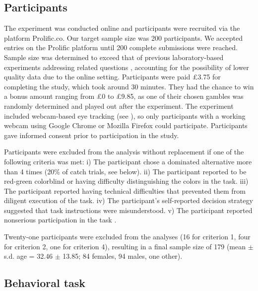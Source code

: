 \documentclass[11pt, a4paper, twocolumn, abstract]{scrartcl}
\begin{document}
\subsection*{Participants}
\label{methods:participants}
The experiment was conducted online and participants were recruited via the platform Prolific.co. Our target sample size was 200 participants. We accepted entries on the Prolific platform until 200 complete submissions were reached. Sample size was determined to exceed that of previous laboratory-based experiments addressing related questions \parencite[e.g.,][]{armel2008BiasingSimpleChoices,liu2020ExploitingDynamicsEye,parnamets2015BiasingMoralDecisions,sui2020TimingGazecontingentDecision,fisher2021IntertemporalChoicesAre}, accounting for the possibility of lower quality data due to the online setting. 
Participants were paid £3.75 for completing the study, which took around 30 minutes. They had the chance to win a bonus amount ranging from £0 to £9.85, as one of their chosen gambles was randomly determined and played out after the experiment. The experiment included webcam-based eye tracking (see ), so only participants with a working webcam using Google Chrome or Mozilla Firefox could participate.
Participants gave informed consent prior to participation in the study.

Participants were excluded from the analysis without replacement if one of the following criteria was met: i) The participant chose a dominated alternative more than 4 times (20\% of catch trials, see below). ii) The participant reported to be red-green colorblind or having difficulty distinguishing the colors in the task. iii) The participant reported having technical difficulties that prevented them from diligent execution of the task. iv) The participant's self-reported decision strategy suggested that task instructions were misunderstood. v) The participant reported nonserious participation in the task \parencite{aust2013SeriousnessChecksAre}.

Twenty-one participants were excluded from the analyses (16 for criterion 1, four for criterion 2, one for criterion 4), resulting in a final sample size of 179 (mean $\pm$ s.d. age = 32.46 $\pm$ 13.85; 84 females, 94 males, one other).

\subsection*{Behavioral task}
\label{sec:methods:task}
\end{document}
